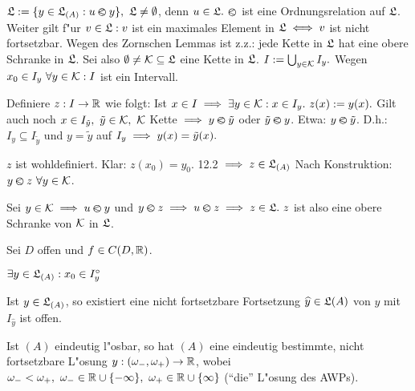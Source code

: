 \documentclass{article}
\begin{document}
\begin{beweis}
$\L:=\{y\in\L_{(A)}:u\ole y\},\ \L\ne\emptyset$, denn $u\in\mathfrak{L}.$ $\varolessthan$ ist eine Ordnungsrelation auf $\mathfrak{L}$. Weiter gilt f"ur $v\in\mathfrak{L}: v$ ist ein maximales Element in $\mathfrak{L} \iff v$ ist nicht fortsetzbar. Wegen des Zornschen Lemmas ist z.z.: jede Kette in $\mathfrak{L}$ hat eine obere Schranke in $\mathfrak{L}$. Sei also $\emptyset \ne \mathcal{K} \subseteq \mathfrak{L}$ eine Kette in $\mathfrak{L}$. $I:=\bigcup_{y\in\mathcal{K}} I_y.$ Wegen $x_0\in I_y\ \forall y\in\mathcal{K}: I$ ist ein Intervall.

Definiere $z:I\to\mathbb{R}$ wie folgt: Ist $x\in I \folgt \exists y\in\K: x\in I_y.\ z(x) := y(x).$ Gilt auch noch $x\in I_{\tilde{y}},\ \tilde{y} \in \mathcal{K},\ \mathcal{K}$ Kette $\implies y \varolessthan \tilde{y}$ oder $\tilde{y} \varolessthan y$. Etwa: $y\varolessthan\tilde{y}$. D.h.: $I_y\subseteq I_{\tilde{y}}$ und $y=\tilde{y}$ auf $I_y \implies y(x)=\tilde{y}(x).$

$z$ ist wohldefiniert. Klar: $z(x_0) = y_0$. 12.2 $\implies z \in \mathfrak{L}_{(A)}$ Nach Konstruktion: $y\varolessthan z\ \forall y\in\mathcal{K}$.

Sei $y\in\mathcal{K} \implies u\varolessthan y$ und $y\ole z \folgt u\ole z \folgt z \in \L.\ z$ ist also eine obere Schranke von $\mathcal{K}$ in $\mathfrak{L}$.
\end{beweis}

\begin{satz} %
Sei $D$ offen und $f\in C(D,\mathbb{R})$.
\begin{liste}
\item $\exists y\in\mathfrak{L}_{(A)}: x_0\in I_y^\circ$
\item Ist $y\in\mathfrak{L}_{(A)}$, so existiert eine nicht fortsetzbare Fortsetzung $\widehat{y}\in\mathfrak{L}{(A)}$ von $y$ mit $I_{\widehat{y}}$ ist offen.
\item Ist $(A)$ eindeutig l"osbar, so hat $(A)$ eine eindeutig bestimmte, nicht fortsetzbare L"osung $y:(\omega_-,\omega_+)\to\mathbb{R}$, wobei $\omega_-<\omega_+,\ \omega_-\in\MdR\cup\{-\infty\},\ \omega_+\in\MdR\cup\{\infty\}$ ("`die"' L"osung des AWPs).
\end{liste}
\end{satz}
\end{document}
